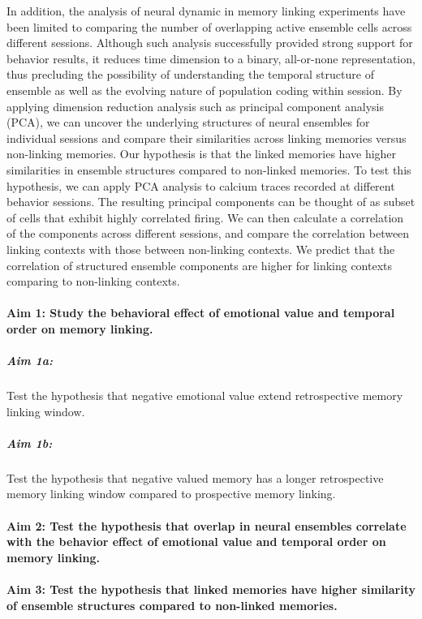 \documentclass[master.tex]{subfiles}
\begin{document}
In addition, the analysis of neural dynamic in memory linking experiments have
been limited to comparing the number of overlapping active ensemble cells across
different sessions. Although such analysis successfully provided strong support
for behavior results, it reduces time dimension to a binary, all-or-none
representation, thus precluding the possibility of understanding the temporal
structure of ensemble as well as the evolving nature of population coding within
session. By applying dimension reduction analysis such as principal component
analysis (PCA), we can uncover the underlying structures of neural ensembles for
individual sessions and compare their similarities across linking memories
versus non-linking memories. Our hypothesis is that the linked memories have
higher similarities in ensemble structures compared to non-linked memories. To
test this hypothesis, we can apply PCA analysis to calcium traces recorded at
different behavior sessions. The resulting principal components can be thought
of as subset of cells that exhibit highly correlated firing. We can then
calculate a correlation of the components across different sessions, and compare
the correlation between linking contexts with those between non-linking
contexts. We predict that the correlation of structured ensemble components are
higher for linking contexts comparing to non-linking contexts.

\paragraph{Aim 1: Study the behavioral effect of emotional value and temporal
  order on memory linking.}

\subparagraph{Aim 1a:} Test the hypothesis that negative emotional value extend
  retrospective memory linking window.

\subparagraph{Aim 1b:} Test the hypothesis that negative valued memory has a
  longer retrospective memory linking window compared to prospective memory
  linking.

\paragraph{Aim 2: Test the hypothesis that overlap in neural ensembles correlate
with the behavior effect of emotional value and temporal order on memory linking.}

\paragraph{Aim 3: Test the hypothesis that linked memories have higher
  similarity of ensemble structures compared to non-linked memories.}

\newpage
\end{document}
